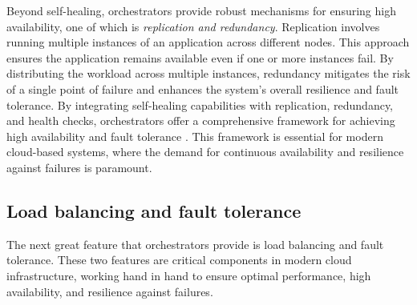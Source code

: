 Beyond self-healing, orchestrators provide robust mechanisms for ensuring high
availability, one of which is \textit{replication and redundancy}.
Replication involves running multiple instances of an application across
different nodes.
This approach ensures the application remains available even if one or more
instances fail.
By distributing the workload across multiple instances, redundancy mitigates the
risk of a single point of failure and enhances the system's overall resilience
and fault tolerance.
By integrating self-healing capabilities with replication, redundancy, and
health checks, orchestrators offer a comprehensive framework for achieving high
availability and fault tolerance \cite{Brendan2016}.
This framework is essential for modern cloud-based systems, where the demand for
continuous availability and resilience against failures is paramount.


\subsection{Load balancing and fault tolerance}\label{subsec:chpt1-load balancing}

The next great feature that orchestrators provide is load balancing and fault
tolerance.
These two features are critical components in modern cloud infrastructure,
working hand in hand to ensure optimal performance, high availability, and
resilience against failures.


